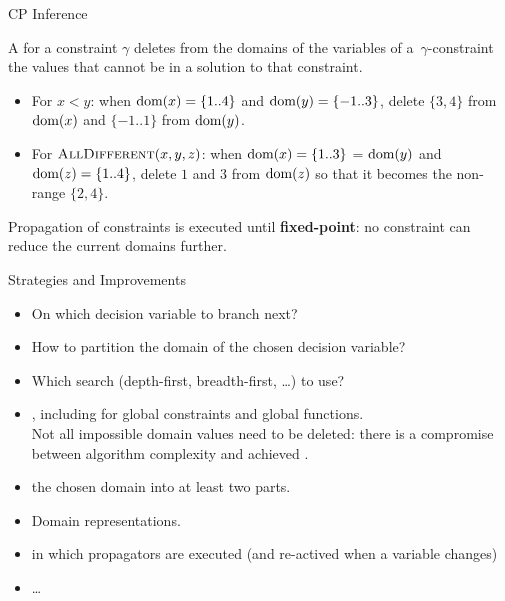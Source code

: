 \documentclass{cons-beamer}
\begin{document}
\begin{frame}{CP Inference}
  \begin{definition}
    A  for a constraint $\gamma$ deletes from the
    domains of the
    variables of a~$\gamma$-constraint
    the values that cannot
    be in a solution to that constraint. \\
  \end{definition}
  \begin{examples}
    \begin{itemize}
      \item For $x < y$: when $\textnormal{dom}(x) = \{1..4\}$ and $\textnormal{dom}(y) = \{-1..3\}$,
        delete $\{3, 4\}$ from $\textnormal{dom}(x)$ and
        $\{-1..1\}$ from $\textnormal{dom}(y)$.
      \item For $\textsc{AllDifferent}(x,y,z)$: when
        $\textnormal{dom}(x) = \{1..3\}$ =
        $\textnormal{dom}(y)$ and $\textnormal{dom}(z) = \{1..4\}$, delete $1$ and $3$ from
        $\textnormal{dom}(z)$ so that it becomes the non-range
        $\{2,4\}$.
    \end{itemize}
  \end{examples}

  Propagation of constraints is executed until \textbf{fixed-point}: no constraint can reduce the current domains further.
\end{frame}

\begin{frame}{Strategies and Improvements}
  \begin{itemize}
    \item On which decision variable to branch next?
    \item How to partition the domain of the chosen decision variable?
    \item Which search (depth-first, breadth-first, \dots) to use?
  \end{itemize}
  \vfill

  \begin{itemize}
    \item {}, including for global constraints and global functions. \\ Not all impossible domain values need to
      be deleted: there is a compromise between algorithm complexity and
      achieved .
    \item {} the chosen domain into at least two parts.
    \item Domain representations.
    \item {} in which propagators are executed (and re-actived when a variable changes)
    \item \dots
  \end{itemize}
\end{frame}
\end{document}
